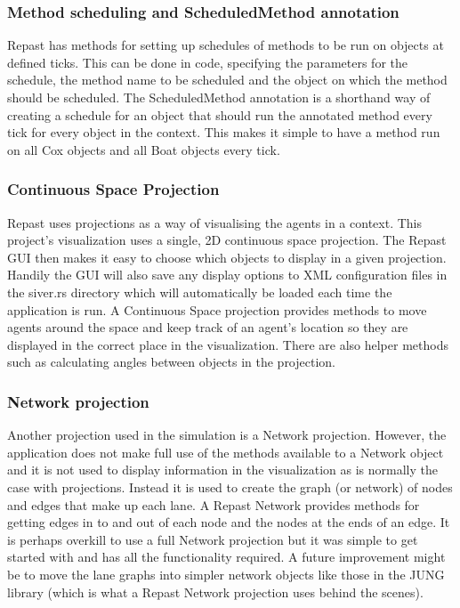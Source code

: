   \subsubsection{Method scheduling and ScheduledMethod annotation}
  Repast has methods for setting up schedules of methods to be run on
  objects at defined ticks. This can be done in code, specifying the
  parameters for the schedule, the method name to be scheduled and the
  object on which the method should be scheduled. The ScheduledMethod annotation is a
  shorthand way of creating a schedule for an object that should run
  the annotated method every tick for every object in the
  context. This makes it simple to have a method run on all Cox
  objects and all Boat objects every tick.


  \subsubsection{Continuous Space Projection}  
  Repast uses projections as a way of visualising the agents in a
  context. This project's visualization uses a single, 2D continuous
  space projection. The Repast GUI then makes it easy to choose which
  objects to display in a given projection. Handily the GUI will also
  save any display options to XML configuration files in the siver.rs
  directory which will automatically be loaded each time the
  application is run. A Continuous Space
  projection provides methods to move agents around the space and keep
  track of an agent's location so they are displayed in the correct
  place in the visualization. There are also helper methods such as
  calculating angles between objects in the projection. 


  \subsubsection{Network projection}\label{software:dependencies:repast:network}
  Another projection used in the simulation is a Network
  projection. However, the application does not make full use of the
  methods available to a Network object and it is not used to display information
  in the visualization as is normally the case with projections. Instead it is used to create the graph (or
  network) of nodes and edges that make up each lane. A Repast Network
  provides methods for getting edges in to and out of each node and
  the nodes at the ends of an edge. It is perhaps overkill to use a
  full Network projection but it was simple to get started with and
  has all the functionality required. A
  future improvement might be to move the lane graphs into simpler
  network objects like those in the JUNG library (which is what a
  Repast Network projection uses behind the scenes).


